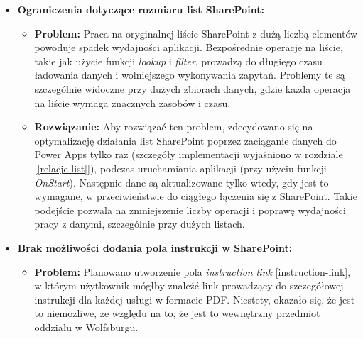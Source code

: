 \begin{itemize}
      \item \textbf{Ograniczenia dotyczące rozmiaru list SharePoint:}
            \begin{itemize}
                  \item \textbf{Problem:} Praca na oryginalnej liście SharePoint z dużą liczbą elementów powoduje spadek wydajności aplikacji. Bezpośrednie operacje na liście, takie jak użycie funkcji \emph{lookup} i \emph{filter}, prowadzą do długiego czasu ładowania danych i wolniejszego wykonywania zapytań. Problemy te są szczególnie widoczne przy dużych zbiorach danych, gdzie każda operacja na liście wymaga znacznych zasobów i czasu.
                  \item \textbf{Rozwiązanie:} Aby rozwiązać ten problem, zdecydowano się na optymalizację działania list SharePoint poprzez zaciąganie danych do Power Apps tylko raz (szczegóły implementacji wyjaśniono w rozdziale [\ref{relacje-list}]), podczas uruchamiania aplikacji (przy użyciu funkcji \emph{OnStart}). Następnie dane są aktualizowane tylko wtedy, gdy jest to wymagane, w przeciwieństwie do ciągłego łączenia się z SharePoint. Takie podejście pozwala na zmniejszenie liczby operacji i poprawę wydajności pracy z danymi, szczególnie przy dużych listach.
            \end{itemize}
      \item \textbf{Brak możliwości dodania pola instrukcji w SharePoint:}
            \begin{itemize}
                  \item \textbf{Problem:} Planowano utworzenie pola \emph{instruction link} \ref{instruction-link}, w którym użytkownik mógłby znaleźć link prowadzący do szczegółowej instrukcji dla każdej usługi w formacie PDF. Niestety, okazało się, że jest to niemożliwe, ze względu na to, że jest to wewnętrzny przedmiot oddziału w Wolfsburgu.
            \end{itemize}
\end{itemize}
